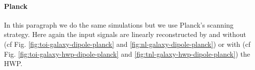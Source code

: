 
\paragraph{Planck \\}

In this paragraph we do the same simulations but we use Planck's scanning strategy. 
Here again the input signals are linearly reconstructed by \rf and \cf without (cf Fig. \ref{fig:toi-galaxy-dipole-planck} and \ref{fig:nl-galaxy-dipole-planck}) or with (cf Fig. \ref{fig:toi-galaxy-hwp-dipole-planck} and \ref{fig:tnl-galaxy-hwp-dipole-planck}) the HWP.

%

